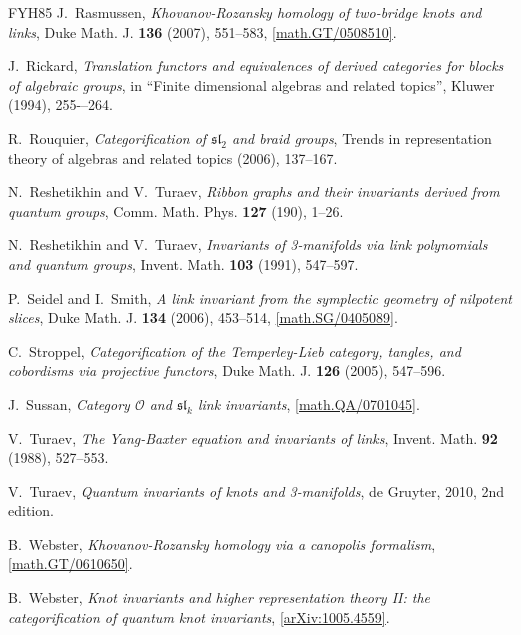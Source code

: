 \documentclass{compositio}
\theoremstyle{definition}
\numberwithin{equation}{section}
\begin{document}
\begin{thebibliography}{FYH{\etalchar{+}}85}
J.~Rasmussen, \emph{Khovanov-{R}ozansky homology of two-bridge knots and links},
  Duke Math. J. \textbf{136} (2007), 551--583,
  \href{http://arxiv.org/abs/math/0508510}{[math.GT/0508510]}.
  
J.~Rickard, \emph{Translation functors and equivalences of derived categories for blocks of algebraic groups}, in “Finite dimensional algebras and related topics”, Kluwer (1994), 255-–264.

R.~Rouquier, \emph{Categorification of {$\mathfrak{sl}_{2}$} and braid groups},
  Trends in representation theory of algebras and related topics (2006),
  137--167.

N.~Reshetikhin and V.~Turaev, \emph{Ribbon graphs and their invariants derived
  from quantum groups}, Comm. Math. Phys. \textbf{127} (190), 1--26.

N.~Reshetikhin and V.~Turaev, \emph{Invariants of 3-manifolds via link polynomials and quantum
  groups}, Invent. Math. \textbf{103} (1991), 547--597.

P.~Seidel and I.~Smith, \emph{A link invariant from the symplectic geometry of
  nilpotent slices}, Duke Math. J. \textbf{134} (2006), 453--514,
  \href{http://arxiv.org/abs/math/0405089}{[math.SG/0405089]}.

C.~Stroppel, \emph{Categorification of the {T}emperley-{L}ieb category,
  tangles, and cobordisms via projective functors}, Duke Math. J. \textbf{126}
  (2005), 547--596.

J.~Sussan, \emph{Category {$\mathcal O$} and {$\mathfrak{sl}_k$} link
  invariants}, \href{http://arxiv.org/abs/math/0701045}{[math.QA/0701045]}.

V.~Turaev, \emph{The {Y}ang-{B}axter equation and invariants of links}, Invent.
  Math. \textbf{92} (1988), 527--553.

V.~Turaev, \emph{Quantum invariants of knots and 3-manifolds}, de Gruyter, 2010,
  2nd edition.

B.~Webster, \emph{Khovanov-Rozansky homology via a canopolis formalism},
  \href{http://arxiv.org/abs/math/0610650}{[math.GT/0610650]}.

B.~Webster, \emph{Knot invariants and higher representation theory {II}: the
  categorification of quantum knot invariants},
  \href{http://arxiv.org/abs/1005.4559}{[arXiv:1005.4559]}.


\end{thebibliography}
\end{document}
